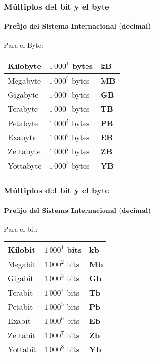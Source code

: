 \documentclass[11pt,a4paper,spanish]{beamer}
\begin{document}
\begin{frame}

\frametitle{Múltiplos del bit y el byte}

    \framesubtitle{Prefijo del Sistema Internacional (decimal)}

Para el Byte:

\centering
\begin{tabular}{l l l}
    Kilobyte & $1\,000^{1}$ bytes & \textbf{kB}\\ \hline
    Megabyte & $1\,000^{2}$ bytes & \textbf{MB}\\ \hline
    Gigabyte & $1\,000^{3}$ bytes & \textbf{GB}\\ \hline
    Terabyte & $1\,000^{4}$ bytes & \textbf{TB}\\ \hline
    Petabyte & $1\,000^{5}$ bytes & \textbf{PB}\\ \hline
    Exabyte & $1\,000^{6}$ bytes & \textbf{EB}\\ \hline
    Zettabyte & $1\,000^{7}$ bytes & \textbf{ZB}\\ \hline
    Yottabyte & $1\,000^{8}$ bytes & \textbf{YB}\\
\end{tabular}

\end{frame}

\begin{frame}

\frametitle{Múltiplos del bit y el byte}

    \framesubtitle{Prefijo del Sistema Internacional (decimal)}

Para el bit:

\centering
\begin{tabular}{l l l}
    Kilobit & $1\,000^{1}$ bits & \textbf{kb}\\ \hline
    Megabit & $1\,000^{2}$ bits & \textbf{Mb}\\ \hline
    Gigabit & $1\,000^{3}$ bits & \textbf{Gb}\\ \hline
    Terabit & $1\,000^{4}$ bits & \textbf{Tb}\\ \hline
    Petabit & $1\,000^{5}$ bits & \textbf{Pb}\\ \hline
    Exabit & $1\,000^{6}$ bits & \textbf{Eb}\\ \hline
    Zettabit & $1\,000^{7}$ bits & \textbf{Zb}\\ \hline
    Yottabit & $1\,000^{8}$ bits & \textbf{Yb}\\
\end{tabular}
\end{frame}
\end{document}

